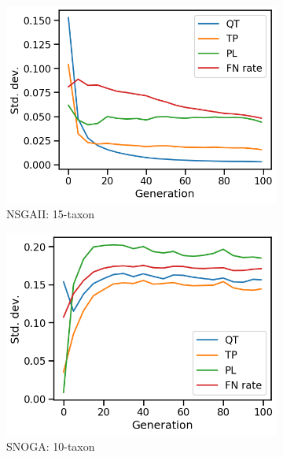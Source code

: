 \begin{figure}[!htbp]
\begin{subfigure}[b]{0.3\textwidth}
			\includegraphics[width=\textwidth]{Figure/15-taxon_NSGAII_std_dev}
			\caption{NSGAII: 15-taxon}
		\end{subfigure}
		\begin{subfigure}[b]{0.3\textwidth}
			\includegraphics[width=\textwidth]{Figure/10-taxon_NOSSGA_std_dev}
			\caption{SNOGA: 10-taxon}
		\end{subfigure}%
		\begin{subfigure}[b]{0.3\textwidth}

\end{subfigure}
\end{figure}
